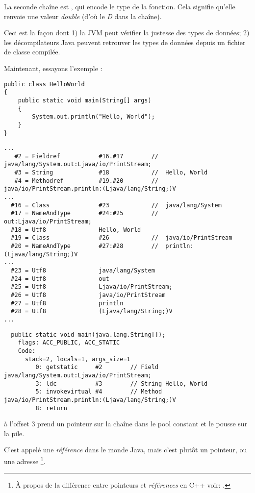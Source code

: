 La seconde chaîne est , qui encode le type de la fonction.
Cela signifie qu'elle renvoie une valeur \emph{double} (d'où le \emph{D} dans la chaîne).

Ceci est la façon dont
1) la JVM peut vérifier la justesse des types de données;
2) les décompilateurs Java peuvent retrouver les types de données depuis un fichier
de classe compilée.


Maintenant, essayons l'exemple :


\begin{lstlisting}[style=customjava]
public class HelloWorld
{
	public static void main(String[] args)
	{
		System.out.println("Hello, World");
	}
}
\end{lstlisting}

\begin{lstlisting}[caption=Constant pool]
...
   #2 = Fieldref           #16.#17        //  java/lang/System.out:Ljava/io/PrintStream;
   #3 = String             #18            //  Hello, World
   #4 = Methodref          #19.#20        //  java/io/PrintStream.println:(Ljava/lang/String;)V
...
  #16 = Class              #23            //  java/lang/System
  #17 = NameAndType        #24:#25        //  out:Ljava/io/PrintStream;
  #18 = Utf8               Hello, World
  #19 = Class              #26            //  java/io/PrintStream
  #20 = NameAndType        #27:#28        //  println:(Ljava/lang/String;)V
...
  #23 = Utf8               java/lang/System
  #24 = Utf8               out
  #25 = Utf8               Ljava/io/PrintStream;
  #26 = Utf8               java/io/PrintStream
  #27 = Utf8               println
  #28 = Utf8               (Ljava/lang/String;)V
...
\end{lstlisting}

\begin{lstlisting}
  public static void main(java.lang.String[]);
    flags: ACC_PUBLIC, ACC_STATIC
    Code:
      stack=2, locals=1, args_size=1
         0: getstatic     #2        // Field java/lang/System.out:Ljava/io/PrintStream;
         3: ldc           #3        // String Hello, World
         5: invokevirtual #4        // Method java/io/PrintStream.println:(Ljava/lang/String;)V
         8: return
\end{lstlisting}

 à l'offset 3 prend un pointeur sur la chaîne  dans le pool
constant et le pousse sur la pile.

C'est appelé une \emph{référence} dans le monde Java, mais c'est plutôt un pointeur,
ou une adresse%
\footnote{À propos de la différence entre pointeurs et \emph{références} en C++ voir: .}.


